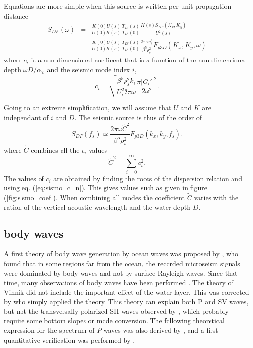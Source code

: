 Equations are more simple when this source is written per unit propagation distance 
\begin{eqnarray}
 S_{DF}(\omega)&=&\frac{K(0) U(s)}{U(0) K(s)} \frac{T_{E \delta}(s)}{T_{E \delta}(0)} \frac{K(s) S_{DF}(K_x,K_y)}{U^2(s)}\\
               &=& \frac{K(0) U(s)}{U(0) K(s)} \frac{T_{E \delta}(s)}{T_{E \delta}(0)} 
               \frac{ 2 \pi \omega c^2_i}{\beta^5 \rho_s^2} F_{p3D}(K_x,K_y,\omega)
\end{eqnarray}
where $c_i$ is a non-dimensional coefficent that is a function of the non-dimensional depth $\omega D/\alpha_w$ and the seismic mode index $i$, 
\begin{equation}
c_i  =  \sqrt{\frac{\beta^5 \rho_s^2 k_i}{ U_i^2 2 \pi \omega } \frac{\pi \left|G_i'\right|^2}{2 \omega^2}}\label{eq:sismo_c_n}.
\end{equation}


Going to an extreme simplification, we will assume that  $U$ and $K$ are independant of  $i$ and $D$. 
The seismic source is thus of the order of 
\begin{equation}
S_{DF}(f_s) \simeq  \frac{2 \pi \omega  \widetilde{C}^2}{\beta^5 \rho_s^2} F_{p3D}(k_x,k_y,f_s).
\label{eq:sismo_SDF}
\end{equation}
where $\widetilde{C}$ combines all the $c_i$ values 
\begin{equation}
\widetilde{C}^2 =  \sum_{i=0}^{\infty} c_i^2.
\end{equation}
The values of  $c_i$ are obtained by finding the roots of the dispersion relation and using eq. (\ref{eq:sismo_c_n}). 
This gives values such as given in figure (\ref{fig:sismo_coef}).  When combining all modes the coefficient $\widetilde{C}$ varies with the 
ration of the vertical acoustic wavelength and the water depth $D$. 

\subsection{body waves}
A first theory  of body wave generation by ocean waves  was proposed by \cite{Vinnik1973}, who found that in some regions far from the ocean, the recorded microseism signals 
were dominated by body waves and not by surface Rayleigh waves. Since that time, many observations of body waves have been performed \citep[e.g.][]{Zhang&al.2010b,Obrebski&al.2013}. 
The theory of Vinnik did not include the important effect of the water layer. This was corrected by \cite{Ardhuin&Herbers2013} who simply applied the \cite{Hasselmann1963c} theory. 
This theory can explain both P and SV waves, but not the transversally polarized SH waves observed by \cite{Nishida&Takagi2016}, which probably require some bottom slopes or mode conversion. 
The following theoretical expression for the spectrum of $P$ waves was also derived by \cite{Gualtieri&al.2014}, and a first quantitative verification was performed by \cite{Farra&al.2016}. 


